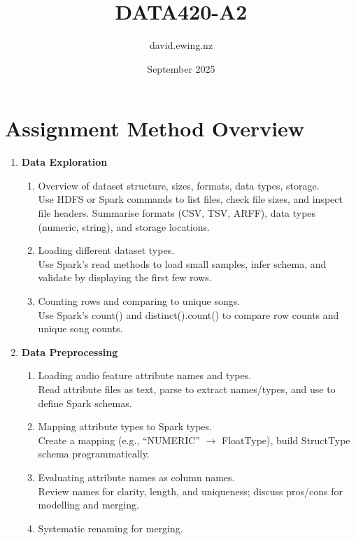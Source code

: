 \documentclass{article}
\title{DATA420-A2}
\author{david.ewing.nz }
\date{September 2025}
\begin{document}
\maketitle


\section*{Assignment Method Overview}

\begin{enumerate}
  \item \textbf{Data Exploration}
    \begin{enumerate}
      \item Overview of dataset structure, sizes, formats, data types, storage.\\
      Use HDFS or Spark commands to list files, check file sizes, and inspect file headers. Summarise formats (CSV, TSV, ARFF), data types (numeric, string), and storage locations.
      \item Loading different dataset types.\\
      Use Spark's read methods to load small samples, infer schema, and validate by displaying the first few rows.
      \item Counting rows and comparing to unique songs.\\
      Use Spark's count() and distinct().count() to compare row counts and unique song counts.
    \end{enumerate}
  \item \textbf{Data Preprocessing}
    \begin{enumerate}
      \item Loading audio feature attribute names and types.\\
      Read attribute files as text, parse to extract names/types, and use to define Spark schemas.
      \item Mapping attribute types to Spark types.\\
      Create a mapping (e.g., ``NUMERIC'' $\rightarrow$ FloatType), build StructType schema programmatically.
      \item Evaluating attribute names as column names.\\
      Review names for clarity, length, and uniqueness; discuss pros/cons for modelling and merging.
      \item Systematic renaming for merging.\\

\end{enumerate}
\end{enumerate}
\end{document}
